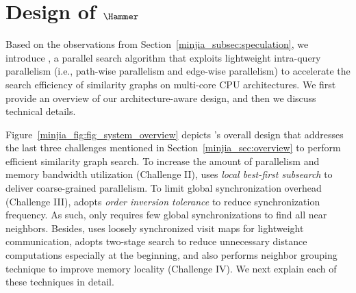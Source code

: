 \section{Design of ${\Hammer}$}

Based on the observations from Section~\ref{minjia_subsec:speculation}, we introduce \Hammer, a
parallel search algorithm that exploits lightweight intra-query parallelism (i.e., path-wise parallelism and edge-wise parallelism) to accelerate the search efficiency of similarity graphs on multi-core CPU architectures. We first provide an overview of our architecture-aware design, and then we discuss technical details.

Figure~\ref{minjia_fig:fig_system_overview} depicts \Hammer's overall design that addresses the last three challenges mentioned in Section~\ref{minjia_sec:overview} to perform efficient similarity graph search.
To increase the amount of parallelism and memory bandwidth utilization (Challenge II), \Hammer uses \emph{local best-first subsearch} to deliver coarse-grained parallelism.
To limit global synchronization overhead (Challenge III), \Hammer adopts \emph{order inversion tolerance} to reduce synchronization frequency.
As such, \Hammer only requires few global synchronizations to find all near neighbors.
Besides, \Hammer uses loosely synchronized visit maps for lightweight communication, adopts two-stage search to reduce unnecessary distance computations especially at the beginning, and also performs neighbor grouping technique to improve memory locality (Challenge IV). We next explain each of these techniques in detail.





